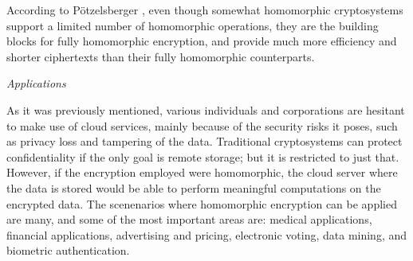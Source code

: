 According to P{\"o}tzelsberger \cite{potzelsberger2013kv}, even though somewhat homomorphic cryptosystems support a limited number of homomorphic operations, they are the building blocks for fully homomorphic encryption, and provide much more efficiency and shorter ciphertexts than their fully homomorphic counterparts. 

\textit{Applications}

As it was previously mentioned, various individuals and corporations are hesitant to make use of cloud services, mainly because of the security risks it poses, such as privacy loss and tampering of the data. Traditional cryptosystems can protect confidentiality if the only goal is remote storage; but it is restricted to just that. However, if the encryption employed were homomorphic, the cloud server where the data is stored would be able to perform meaningful computations on the encrypted data.  The scenenarios where homomorphic encryption can be applied are many, and some of the most important areas are: medical applications, financial applications, advertising and pricing, electronic voting, data mining, and biometric authentication.


